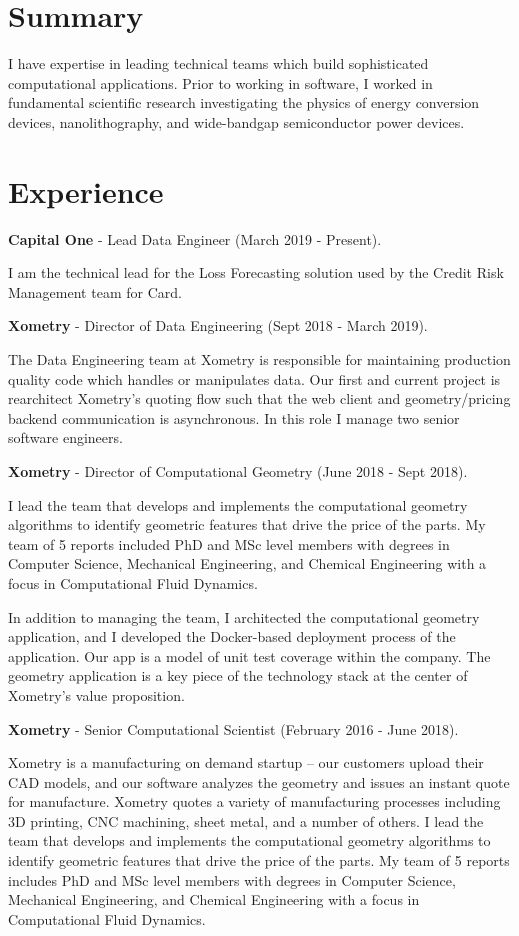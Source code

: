 \section{Summary}\label{summary}

I have expertise in leading technical teams which build sophisticated
computational applications. Prior to working in software, I worked in
fundamental scientific research investigating the physics of energy
conversion devices, nanolithography, and wide-bandgap semiconductor
power devices.

\section{Experience}\label{experience}

\textbf{Capital One} - Lead Data Engineer (March 2019 - Present).

I am the technical lead for the Loss Forecasting solution used by the
Credit Risk Management team for Card.

\textbf{Xometry} - Director of Data Engineering (Sept 2018 - March
2019).

The Data Engineering team at Xometry is responsible for maintaining
production quality code which handles or manipulates data. Our first and
current project is rearchitect Xometry's quoting flow such that the web
client and geometry/pricing backend communication is asynchronous. In
this role I manage two senior software engineers.

\textbf{Xometry} - Director of Computational Geometry (June 2018 - Sept
2018).

I lead the team that develops and implements the computational geometry
algorithms to identify geometric features that drive the price of the
parts. My team of 5 reports included PhD and MSc level members with
degrees in Computer Science, Mechanical Engineering, and Chemical
Engineering with a focus in Computational Fluid Dynamics.

In addition to managing the team, I architected the computational
geometry application, and I developed the Docker-based deployment
process of the application. Our app is a model of unit test coverage
within the company. The geometry application is a key piece of the
technology stack at the center of Xometry's value proposition.

\textbf{Xometry} - Senior Computational Scientist (February 2016 - June
2018).

Xometry is a manufacturing on demand startup -- our customers upload
their CAD models, and our software analyzes the geometry and issues an
instant quote for manufacture. Xometry quotes a variety of manufacturing
processes including 3D printing, CNC machining, sheet metal, and a
number of others. I lead the team that develops and implements the
computational geometry algorithms to identify geometric features that
drive the price of the parts. My team of 5 reports includes PhD and MSc
level members with degrees in Computer Science, Mechanical Engineering,
and Chemical Engineering with a focus in Computational Fluid Dynamics.

